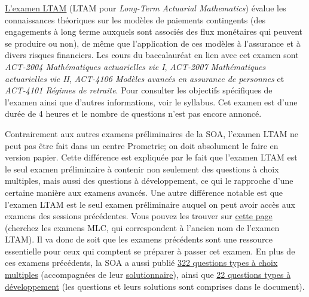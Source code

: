 \href{https://www.soa.org/Education/Exam-Req/edu-exam-ltam-detail.aspx}{L'examen LTAM} (LTAM pour \textit{Long-Term Actuarial Mathematics}) évalue les connaissances théoriques sur les modèles de paiements contingents (des engagements à long terme auxquels sont associés des flux monétaires qui peuvent se produire ou non), de même que l'application de ces modèles à l'assurance et à divers risques financiers.  Les cours du baccalauréat en lien avec cet examen sont \textit{ACT-2004 Mathématiques actuarielles vie I}, \textit{ACT-2007 Mathématiques actuarielles vie II}, \textit{ACT-4106 Modèles avancés en assurance de personnes} et \textit{ACT-4101 Régimes de retraite}. Pour consulter les objectifs spécifiques de l'examen ainsi que d'autres informations, voir le syllabus. Cet examen est d'une durée de 4 heures et le nombre de questions n'est pas encore annoncé. \vspace{\baselineskip}

Contrairement aux autres examens préliminaires de la SOA, l'examen LTAM ne peut pas être fait dans un centre Prometric; on doit absolument le faire en version papier. Cette différence est expliquée par le fait que l'examen LTAM est le seul examen préliminaire à contenir non seulement des questions à choix multiples, mais aussi des questions à développement, ce qui le rapproche d'une certaine manière aux examens avancés. Une autre différence notable est que l'examen LTAM est le seul examen préliminaire auquel on peut avoir accès aux examens des sessions précédentes. Vous pouvez les trouver sur \href{https://www.soa.org/education/exam-req/syllabus-study-materials/edu-multiple-choice-exam.aspx}{cette page} (cherchez les examens MLC, qui correspondent à l'ancien nom de l'examen LTAM). Il va donc de soit que les examens précédents sont une ressource essentielle pour ceux qui comptent se préparer à passer cet examen. En plus de ces examens précédents, la SOA a aussi publié \href{http://www.soa.org/files/edu/edu-2014-spring-mlc-ques.pdf}{322 questions types à choix multiples} (accompagnées de leur \href{http://www.soa.org/files/edu/edu-2014-spring-mlc-sol.pdf}{solutionnaire}), ainsi que \href{http://www.soa.org/files/edu/edu-2014-spring-mlc-ques-sol.pdf}{22 questions types à développement} (les questions et leurs solutions sont comprises dans le document). \vspace{\baselineskip}

